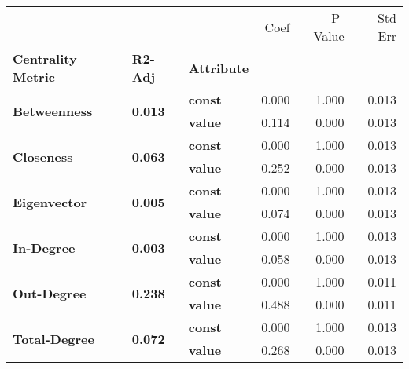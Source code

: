 \begin{tabular}{lllrrr}
\toprule
             &       &       &  Coef &  P-Value &  Std Err \\
\textbf{Centrality Metric} & \textbf{R2-Adj} & \textbf{Attribute} &       &          &          \\
\midrule
\multirow{2}{*}{\textbf{Betweenness}} & \multirow{2}{*}{\textbf{0.013}} & \textbf{const} & 0.000 &    1.000 &    0.013 \\
             &       & \textbf{value} & 0.114 &    0.000 &    0.013 \\
\cline{1-6}
\cline{2-6}
\multirow{2}{*}{\textbf{Closeness}} & \multirow{2}{*}{\textbf{0.063}} & \textbf{const} & 0.000 &    1.000 &    0.013 \\
             &       & \textbf{value} & 0.252 &    0.000 &    0.013 \\
\cline{1-6}
\cline{2-6}
\multirow{2}{*}{\textbf{Eigenvector}} & \multirow{2}{*}{\textbf{0.005}} & \textbf{const} & 0.000 &    1.000 &    0.013 \\
             &       & \textbf{value} & 0.074 &    0.000 &    0.013 \\
\cline{1-6}
\cline{2-6}
\multirow{2}{*}{\textbf{In-Degree}} & \multirow{2}{*}{\textbf{0.003}} & \textbf{const} & 0.000 &    1.000 &    0.013 \\
             &       & \textbf{value} & 0.058 &    0.000 &    0.013 \\
\cline{1-6}
\cline{2-6}
\multirow{2}{*}{\textbf{Out-Degree}} & \multirow{2}{*}{\textbf{0.238}} & \textbf{const} & 0.000 &    1.000 &    0.011 \\
             &       & \textbf{value} & 0.488 &    0.000 &    0.011 \\
\cline{1-6}
\cline{2-6}
\multirow{2}{*}{\textbf{Total-Degree}} & \multirow{2}{*}{\textbf{0.072}} & \textbf{const} & 0.000 &    1.000 &    0.013 \\
             &       & \textbf{value} & 0.268 &    0.000 &    0.013 \\
\bottomrule
\end{tabular}
